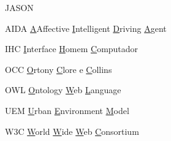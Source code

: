 \begin{listofabbrv}{JASON}
        \item[AIDA] \underline{A}Affective \underline{I}ntelligent \underline{D}riving \underline{A}gent
        \item[IHC] \underline{I}nterface \underline{H}omem \underline{C}omputador
        \item[OCC] \underline{O}rtony \underline{C}lore e \underline{C}ollins
        \item[OWL] \underline{O}ntology \underline{W}eb \underline{L}anguage
		\item[UEM] \underline{U}rban \underline{E}nvironment \underline{M}odel
        \item[W3C] \underline{W}orld \underline{W}ide \underline{W}eb \underline{C}onsortium
\end{listofabbrv}
